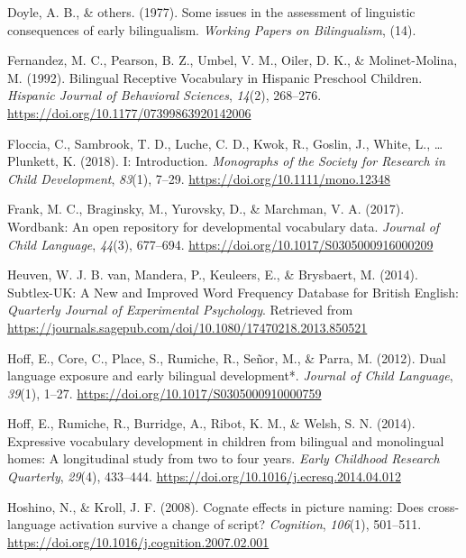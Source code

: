\documentclass[english,man,man,floatsintext]{apa6}
\begin{document}
\leavevmode\hypertarget{ref-doyle1977some}{}%
Doyle, A. B., \& others. (1977). Some issues in the assessment of linguistic consequences of early bilingualism. \emph{Working Papers on Bilingualism}, (14).

\leavevmode\hypertarget{ref-fernandez1992}{}%
Fernandez, M. C., Pearson, B. Z., Umbel, V. M., Oiler, D. K., \& Molinet-Molina, M. (1992). Bilingual Receptive Vocabulary in Hispanic Preschool Children. \emph{Hispanic Journal of Behavioral Sciences}, \emph{14}(2), 268--276. \url{https://doi.org/10.1177/07399863920142006}

\leavevmode\hypertarget{ref-floccia2018}{}%
Floccia, C., Sambrook, T. D., Luche, C. D., Kwok, R., Goslin, J., White, L., \ldots{} Plunkett, K. (2018). I: Introduction. \emph{Monographs of the Society for Research in Child Development}, \emph{83}(1), 7--29. \url{https://doi.org/10.1111/mono.12348}

\leavevmode\hypertarget{ref-frank2017}{}%
Frank, M. C., Braginsky, M., Yurovsky, D., \& Marchman, V. A. (2017). Wordbank: An open repository for developmental vocabulary data. \emph{Journal of Child Language}, \emph{44}(3), 677--694. \url{https://doi.org/10.1017/S0305000916000209}

\leavevmode\hypertarget{ref-heuven2014}{}%
Heuven, W. J. B. van, Mandera, P., Keuleers, E., \& Brysbaert, M. (2014). Subtlex-UK: A New and Improved Word Frequency Database for British English: \emph{Quarterly Journal of Experimental Psychology}. Retrieved from \url{https://journals.sagepub.com/doi/10.1080/17470218.2013.850521}

\leavevmode\hypertarget{ref-hoff2012}{}%
Hoff, E., Core, C., Place, S., Rumiche, R., Señor, M., \& Parra, M. (2012). Dual language exposure and early bilingual development*. \emph{Journal of Child Language}, \emph{39}(1), 1--27. \url{https://doi.org/10.1017/S0305000910000759}

\leavevmode\hypertarget{ref-hoff2014}{}%
Hoff, E., Rumiche, R., Burridge, A., Ribot, K. M., \& Welsh, S. N. (2014). Expressive vocabulary development in children from bilingual and monolingual homes: A longitudinal study from two to four years. \emph{Early Childhood Research Quarterly}, \emph{29}(4), 433--444. \url{https://doi.org/10.1016/j.ecresq.2014.04.012}

\leavevmode\hypertarget{ref-hoshino2008}{}%
Hoshino, N., \& Kroll, J. F. (2008). Cognate effects in picture naming: Does cross-language activation survive a change of script? \emph{Cognition}, \emph{106}(1), 501--511. \url{https://doi.org/10.1016/j.cognition.2007.02.001}
\end{document}
